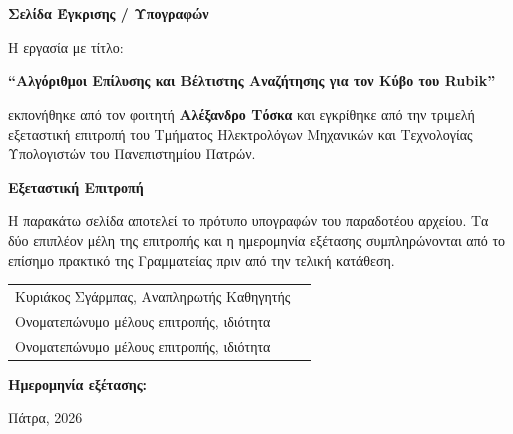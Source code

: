 
\chapter*{}
\thispagestyle{empty}

\begin{samepage}
\vspace*{1.6cm}

\begin{center}
\textbf{\Large Σελίδα Έγκρισης / Υπογραφών}
\end{center}

\vspace{0.9cm}

Η εργασία με τίτλο:

\vspace{0.35cm}
\begin{center}
\textbf{``Αλγόριθμοι Επίλυσης και Βέλτιστης Αναζήτησης για τον Κύβο του Rubik''}
\end{center}

\vspace{0.35cm}
\noindent εκπονήθηκε από τον φοιτητή \textbf{Αλέξανδρο Τόσκα} και εγκρίθηκε
από την τριμελή εξεταστική επιτροπή του Τμήματος Ηλεκτρολόγων Μηχανικών και
Τεχνολογίας Υπολογιστών του Πανεπιστημίου Πατρών.

\vspace{0.65cm}

\noindent\textbf{Εξεταστική Επιτροπή}

\vspace{0.3cm}
\noindent Η παρακάτω σελίδα αποτελεί το πρότυπο υπογραφών του παραδοτέου
αρχείου. Τα δύο επιπλέον μέλη της επιτροπής και η ημερομηνία εξέτασης
συμπληρώνονται από το επίσημο πρακτικό της Γραμματείας πριν από την τελική
κατάθεση.

\vspace{0.45cm}

\begin{center}
\begin{tabular}{p{9cm}c}
Κυριάκος Σγάρμπας, Αναπληρωτής Καθηγητής & \dotfill \\[0.8cm]
Ονοματεπώνυμο μέλους επιτροπής, ιδιότητα & \dotfill \\[0.8cm]
Ονοματεπώνυμο μέλους επιτροπής, ιδιότητα & \dotfill \\[0.8cm]
\end{tabular}
\end{center}

\vspace{0.35cm}

\noindent\textbf{Ημερομηνία εξέτασης:} \dotfill

\vspace{0.75cm}

\begin{center}
Πάτρα, 2026
\end{center}
\end{samepage}
